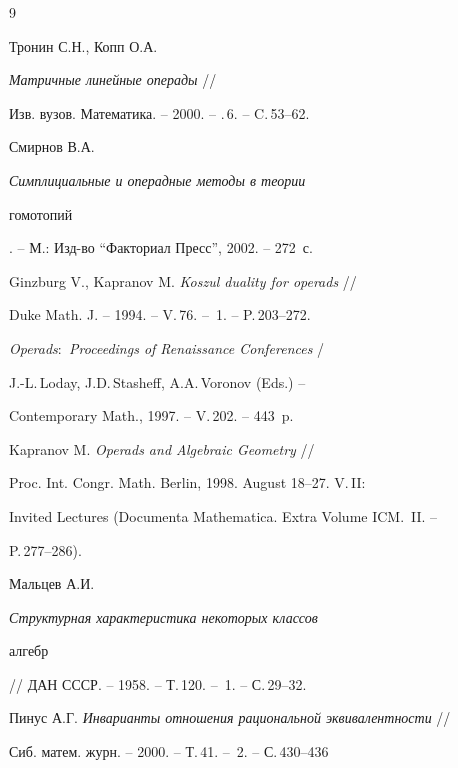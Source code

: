 \begin{thebibliography}{9}







Тронин С.Н., Копп О.А.


{\em Матричные линейные операды} //


Изв. вузов. Математика. -- 2000. -- \No.\,6. -- C.\,53--62.




Смирнов В.А. {\em Симплициальные и операдные методы в теории


гомотопий}. -- М.: Изд-во ``Факториал Пресс'', 2002. -- 272~с.







Ginzburg V., Kapranov M. {\em Koszul duality for operads} //


Duke Math. J. -- 1994. -- V.\,76. -- \No\,1. -- P.\,203--272.







{\em Operads\/${:}$ Proceedings of Renaissance Conferences} /


J.-L.\,Loday, J.D.\,Stasheff, A.A.\,Voronov (Eds.) --


Contemporary Math., 1997. -- V.\,202. -- 443~p.







Kapranov M. {\em Operads and Algebraic Geometry} //


Proc. Int. Congr. Math. Berlin, 1998. August 18--27. V.\,II:


Invited Lectures (Documenta Mathematica. Extra Volume ICM.~II. --


P.\,277--286).










Мальцев А.И. {\em Структурная характеристика некоторых классов


алгебр} // ДАН СССР. -- 1958. -- Т.\,120. -- \No\,1. -- С.\,29--32.










Пинус А.Г. {\em Инварианты отношения рациональной эквивалентности} //


Сиб. матем. журн. -- 2000. -- Т.\,41. -- \No\,2. -- С.\,430--436





\end{thebibliography}





